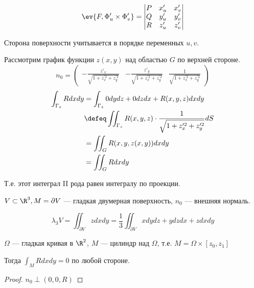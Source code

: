 \begin{remark}
\begin{itemize}
              \begin{equation}
                  \ev{F, \Phi'_u \times \Phi'_v} = \begin{vmatrix} P & x'_u & x'_v \\ Q & y'_u & y'_v \\ R & z'_u & z'_v \end{vmatrix} \label{смешанное произведение}
              \end{equation}

              Сторона поверхности учитывается в порядке переменных \(u, v\).
    \end{itemize}
\end{remark}

\begin{example}
    Рассмотрим график функции \(z(x, y)\) над областью \(G\) по верхней стороне.
    \[n_0 = \begin{pmatrix} - \frac{z'_x}{\sqrt{1 + z_x^{\prime 2} + z_y^{\prime 2}}} & - \frac{z'_y}{\sqrt{1 + z_x^{\prime 2} + z_y^{\prime 2}}} & \frac{1}{\sqrt{1 + z_x^{\prime 2} + z_y^{\prime 2}}} \end{pmatrix} \]
    \begin{align*}
        \int_{\Gamma_z} R dx dy & = \int_{\Gamma_z} 0 dy dz + 0 dz dx + R(x, y, z) dx dy                                           \\
                                & \defeq \iint_{\Gamma_z} R(x, y, z) \cdot \frac{1}{\sqrt{1 + z_x^{\prime 2} + z_y^{\prime 2}}} dS \\
                                & = \iint_G R(x, y, z(x, y)) dx dy                                                                 \\
                                & = \iint_G R dx dy
    \end{align*}

    Т.е. этот интеграл II рода равен интегралу по проекции.
\end{example}

\begin{corollary*}
    \(V \subset \R^3, M = \partial V\) --- гладкая двумерная поверхность, \(n_0\) --- внешняя нормаль.

    \[\lambda_3 V = \iint_{\partial V} z dx dy = \frac{1}{3} \iint_{\partial V} x dy dz + y dz dx + z dx dy\]
\end{corollary*}

\begin{corollary*}
    \(\Omega\) --- гладкая кривая в \(\R^2\), \(M\) --- цилиндр над \(\Omega\), т.е. \(M = \Omega \times [z_0, z_1]\)

    Тогда \(\int_M R dx dy = 0\) по любой стороне.
\end{corollary*}
\begin{proof}
    \(n_0 \perp (0, 0, R)\)
\end{proof}

